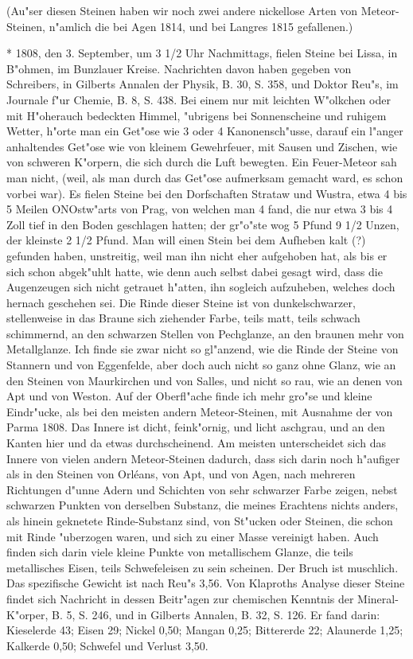 \documentclass[a4paper, 11pt, oneside, polutonikogreek, german]{article}
\begin{document}
(Au"ser diesen Steinen haben wir noch zwei andere nickellose Arten von Meteor-Steinen, n"amlich die bei Agen 1814, und bei Langres 1815 gefallenen.)

* 1808, den 3. September, um 3 1/2 Uhr Nachmittags, fielen Steine bei Lissa, in B"ohmen, im Bunzlauer Kreise. Nachrichten davon haben gegeben von Schreibers, in Gilberts Annalen der Physik, B. 30, S. 358, und Doktor Reu"s, im Journale f"ur Chemie, B. 8, S. 438. Bei einem nur mit leichten W"olkchen oder mit H"oherauch bedeckten Himmel, "ubrigens bei Sonnenscheine und ruhigem Wetter, h"orte man ein Get"ose wie 3 oder 4 Kanonensch"usse, darauf ein l"anger anhaltendes Get"ose wie von kleinem Gewehrfeuer, mit Sausen und Zischen, wie von schweren K"orpern, die sich durch die Luft bewegten. Ein Feuer-Meteor sah man nicht, (weil, als man durch das Get"ose aufmerksam gemacht ward, es schon vorbei war). Es fielen Steine bei den Dorfschaften Strataw und Wustra, etwa 4 bis 5 Meilen ONOstw"arts von Prag, von welchen man 4 fand, die nur etwa 3 bis 4 Zoll tief in den Boden geschlagen hatten; der gr"o"ste wog 5 Pfund 9 1/2 Unzen, der kleinste 2 1/2 Pfund. Man will einen Stein bei dem Aufheben kalt (?) gefunden haben, unstreitig, weil man ihn nicht eher aufgehoben hat, als bis er sich schon abgek"uhlt hatte, wie denn auch selbst dabei gesagt wird, dass die Augenzeugen sich nicht getrauet h"atten, ihn sogleich aufzuheben, welches doch hernach geschehen sei. Die Rinde dieser Steine ist von dunkelschwarzer, stellenweise in das Braune sich ziehender Farbe, teils matt, teils schwach schimmernd, an den schwarzen Stellen von Pechglanze, an den braunen mehr von Metallglanze. Ich finde sie zwar nicht so gl"anzend, wie die Rinde der Steine von Stannern und von Eggenfelde, aber doch auch nicht so ganz ohne Glanz, wie an den Steinen von Maurkirchen und von Salles, und nicht so rau, wie an denen von Apt und von Weston. Auf der Oberfl"ache finde ich mehr gro"se und kleine Eindr"ucke, als bei den meisten andern Meteor-Steinen, mit Ausnahme der von Parma 1808. Das Innere ist dicht, feink"ornig, und licht aschgrau, und an den Kanten hier und da etwas durchscheinend. Am meisten unterscheidet sich das Innere von vielen andern Meteor-Steinen dadurch, dass sich darin noch h"aufiger als in den Steinen von Orléans, von Apt, und von Agen, nach mehreren Richtungen d"unne Adern und Schichten von sehr schwarzer Farbe zeigen, nebst schwarzen Punkten von derselben Substanz, die meines Erachtens nichts anders, als hinein geknetete Rinde-Substanz sind, von St"ucken oder Steinen, die schon mit Rinde "uberzogen waren, und sich zu einer Masse vereinigt haben. Auch finden sich darin viele kleine Punkte von metallischem Glanze, die teils metallisches Eisen, teils Schwefeleisen zu sein scheinen. Der Bruch ist muschlich. Das spezifische Gewicht ist nach Reu"s 3,56. Von Klaproths Analyse dieser Steine findet sich Nachricht in dessen Beitr"agen zur chemischen Kenntnis der Mineral-K"orper, B. 5, S. 246, und in Gilberts Annalen, B. 32, S. 126. Er fand darin: Kieselerde 43; Eisen 29; Nickel 0,50; Mangan 0,25; Bittererde 22; Alaunerde 1,25; Kalkerde 0,50; Schwefel und Verlust 3,50.
\end{document}

